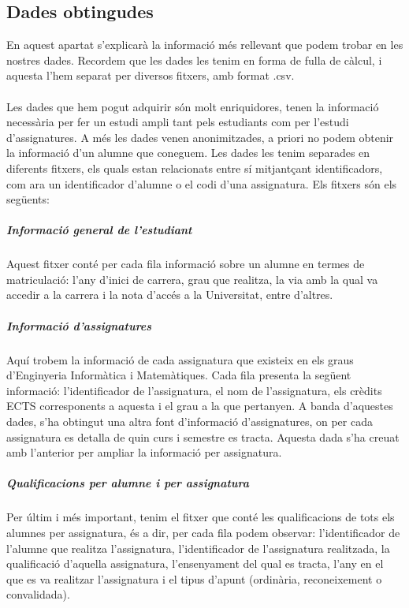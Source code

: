 \documentclass[12pt,a4paper,catalan]{article}
\begin{document}
\newpage

\subsection{Dades obtingudes}
\label{subsec:explicaciodadesobtingudes} 
En aquest apartat s'explicarà la informació més rellevant que podem trobar en les nostres dades. Recordem que les dades les tenim en forma de fulla de càlcul, i aquesta l'hem separat per diversos fitxers, amb format .csv.
\\
\\
Les dades que hem pogut adquirir són molt enriquidores, tenen la informació necessària per fer un estudi ampli tant pels estudiants com per l'estudi d'assignatures. A més les dades venen anonimitzades, a priori no podem obtenir la informació d'un alumne que coneguem. Les dades les tenim separades en diferents fitxers, els quals estan relacionats entre sí mitjantçant identificadors, com ara un identificador d'alumne o el codi d'una assignatura. Els fitxers són els següents:

\subparagraph{Informació general de l'estudiant}
Aquest fitxer conté per cada fila informació sobre un alumne en termes de matriculació: l'any d'inici de carrera, grau que realitza, la via amb la qual va accedir a la carrera i la nota d'accés a la Universitat, entre d'altres.

\subparagraph{Informació d'assignatures}
Aquí trobem la informació de cada assignatura que existeix en els graus d'Enginyeria Informàtica i Matemàtiques. Cada fila presenta la següent informació: l'identificador de l'assignatura, el nom de l'assignatura, els crèdits ECTS corresponents a aquesta i el grau a la que pertanyen. A banda d'aquestes dades, s'ha obtingut una altra font d'informació d'assignatures, on per cada assignatura es detalla de quin curs i semestre es tracta. Aquesta dada s'ha creuat amb l'anterior per ampliar la informació per assignatura.

\subparagraph{Qualificacions per alumne i per assignatura}
Per últim i més important, tenim el fitxer que conté les qualificacions de tots els alumnes per assignatura, és a dir, per cada fila podem observar: l'identificador de l'alumne que realitza l'assignatura, l'identificador de l'assignatura realitzada, la qualificació d'aquella assignatura, l'ensenyament del qual es tracta, l'any en el que es va realitzar l'assignatura i el tipus d'apunt (ordinària, reconeixement o convalidada).

\newpage
\end{document}

